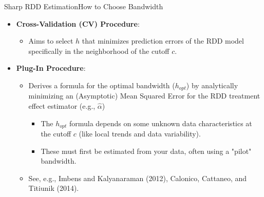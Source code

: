 \documentclass[dvipsnames,hyperref={pdfpagelabels=false}]{beamer}
\begin{document}
\begin{frame}{Sharp RDD Estimation}{How to Choose Bandwidth}
	\begin{itemize}
		\item[1.] \textbf{Cross-Validation (CV) Procedure}:
		\vspace{0.2cm}
		\begin{itemize}
			\item Aims to select $h$ that minimizes prediction errors of the RDD model specifically in the neighborhood of the cutoff $c$.
		\end{itemize}
		\vspace{0.3cm} %
		\item[2.] \textbf{Plug-In Procedure}:
		\vspace{0.2cm}
		\begin{itemize}
			\item Derives a formula for the optimal bandwidth ($h_{opt}$) by analytically minimizing an (Asymptotic) Mean Squared Error for the RDD treatment effect estimator (e.g., $\hat{\alpha}$)
			
			\vspace{0.2cm}
			\begin{itemize}
				\item The $h_{opt}$ formula depends on some unknown data characteristics at the cutoff $c$ (like local trends and data variability). 
				\vspace{0.2cm}
				\item These must first be estimated from your data, often using a "pilot" bandwidth.
				\vspace{0.2cm}
			\end{itemize}		
			\item See, e.g., Imbens and Kalyanaraman (2012), Calonico, Cattaneo, and Titiunik (2014).
		\end{itemize}
	\end{itemize}
\end{frame}
\end{document}
